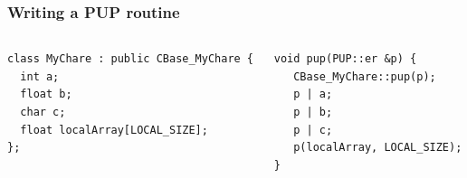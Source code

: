 
\begin{frame}[fragile]
\frametitle{Writing a PUP routine}
 \begin{columns}
 \begin{column}{0.5\textwidth}
   \begin{lstlisting}
class MyChare : public CBase_MyChare {
  int a;
  float b;
  char c;
  float localArray[LOCAL_SIZE];
};
 \end{lstlisting}
 \end{column}
 \begin{column}{0.5\textwidth}
  \begin{lstlisting}
void pup(PUP::er &p) {
   CBase_MyChare::pup(p);
   p | a;
   p | b;
   p | c;
   p(localArray, LOCAL_SIZE);
}
  \end{lstlisting}
  \end{column}
  \end{columns}
\end{frame}

